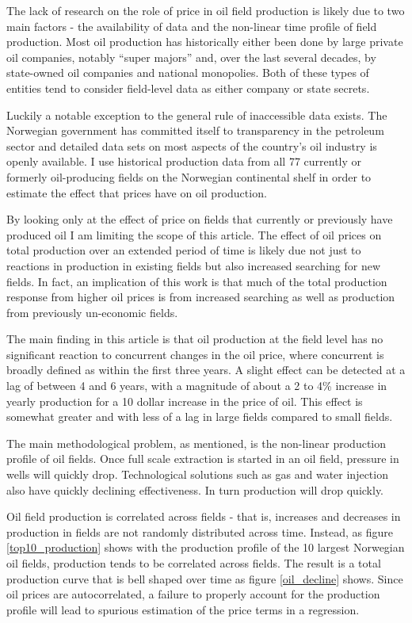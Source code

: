 \documentclass[12pt]{scrartcl} %
\begin{document}
The lack of research on the role of price in oil field production is likely due to two main factors - the availability of data and the non-linear time profile of field production.  Most oil production has historically either been done by large private oil companies, notably “super majors” and, over the last several decades, by state-owned oil companies and national monopolies.  Both of these types of entities tend to consider field-level data as either company or state secrets.   

Luckily a notable exception to the general rule of inaccessible data exists.  The Norwegian government has committed itself to transparency in the petroleum sector and detailed data sets on most aspects of the country’s oil industry is openly available.  I use historical production data from all 77 currently or formerly oil-producing fields on the Norwegian continental shelf in order to estimate the effect that prices have on oil production.  

By looking only at the effect of price on fields that currently or previously have produced oil I am limiting the scope of this article.  The effect of oil prices on total production over an extended period of time is likely due not just to reactions in production in existing fields but also increased searching for new fields.  In fact, an implication of this work is that much of the total production response from higher oil prices is from increased searching as well as production from previously un-economic fields.

The main finding in this article is that oil production at the field level has no significant reaction to concurrent changes in the oil price, where concurrent is broadly defined as within the first three years.  A slight effect can be detected at a lag of between 4 and 6 years, with a magnitude of about a 2 to 4\% increase in yearly production for a 10 dollar increase in the price of oil.  This effect is somewhat greater and with less of a lag in large fields compared to small fields.

The main methodological problem, as mentioned, is the non-linear production profile of oil fields.  Once full scale extraction is started in an oil field, pressure in wells will quickly drop.  Technological solutions such as gas and water injection also have quickly declining effectiveness.  In turn production will drop quickly. 

Oil field production is correlated across fields - that is, increases and decreases in production in fields are not randomly distributed across time.  Instead, as figure \ref{top10_production} shows with the production profile of the 10 largest Norwegian oil fields, production tends to be correlated across fields.  The result is a total production curve that is bell shaped over time as figure \ref{oil_decline}  shows.  Since oil prices are autocorrelated, a failure to properly account for the production profile will lead to spurious estimation of the price terms in a regression.  
\end{document}
